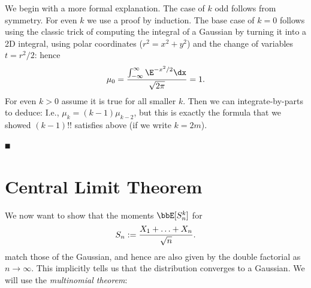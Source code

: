 We begin with a more formal explanation.  The case of $k$ odd follows from symmetry. For even $k$ we  use a proof by induction. The base case of $k = 0$ follows using the classic trick of computing the integral of a Gaussian by turning it into a 2D integral, using polar coordinates ($r^2 = x^2 + y^2$) and the change of variables $t = r^2/2$:
hence
\[
\ensuremath{\mu}_0 = {\ensuremath{\int}_{-\ensuremath{\infty}}^\ensuremath{\infty} \E^{-x^2/2} \dx \over \sqrt{2\ensuremath{\pi}}} = 1.
\]
For even $k> 0$ assume it is true for all smaller $k$. Then we can integrate-by-parts to deduce:
I.e., $\ensuremath{\mu}_k = (k-1) \ensuremath{\mu}_{k-2}$, but this is exactly the formula that we showed $(k-1)!!$ satisfies above (if we write $k = 2m$).

\ensuremath{\QED}

\section{Central Limit Theorem}
We now want to show that the moments $\ensuremath{\bbE}[S_n^k]$ for
\[
S_n := {X_1 + \ensuremath{\ldots} + X_n \over \sqrt{n}}.
\]
match those of the Gaussian, and hence are also given by the double factorial as $n \ensuremath{\rightarrow} \ensuremath{\infty}$. This implicitly tells us that the distribution converges to a Gaussian.  We will use the \emph{multinomial theorem}:

